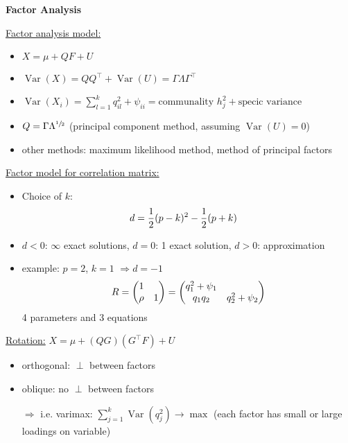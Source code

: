 \documentclass[10pt,landscape,a4paper]{article}
\DeclareMathOperator{\Var}{Var}
\begin{document}
\begin{multicols*}{4}
\begin{center}
	\normalsize{\textbf{Factor Analysis}} \\
\end{center}
\underline{Factor analysis model:}
\begin{itemize}
	\item $X = \mu + QF + U$
	\item $\Var(X) = QQ^\top + \Var(U) = \Gamma\Lambda\Gamma^\top$
	\item $\Var(X_i) = \sum_{l=1}^{k} q_{il}^2 + \psi_{ii} = \text{communality } h_j^2 + \text{specic variance}$
	\item $Q = \Gamma\Lambda^{\sfrac{1}{2}}$ (principal component method, assuming $\Var(U) = 0$)
	\item other methods: maximum likelihood method, method of principal factors
\end{itemize}
\underline{Factor model for correlation matrix:}
\begin{itemize}
	\item Choice of $k$:
	\begin{align}
		d &= \frac{1}{2}(p-k)^2 - \frac{1}{2}(p+k) \notag
	\end{align}
	\item $d<0$: $\infty$ exact solutions, $d=0$: 1 exact solution, $d>0$: approximation
	\item example: $p=2$, $k=1$ $\Rightarrow d=-1$
	\begin{align}
		R = \begin{pmatrix}
			1 & \\ \rho & 1
		\end{pmatrix} = \begin{pmatrix}
			q_1^2 + \psi_1 & \\ q_1q_2 & q_2^2 + \psi_2
		\end{pmatrix} \notag
	\end{align}
	4 parameters and 3 equations
\end{itemize}
\underline{Rotation:} $X = \mu + (QG)(G^\top F) + U$
\begin{itemize}
	\item orthogonal: $\perp$ between factors
	\item oblique: no $\perp$ between factors
	\item[$\Rightarrow$] i.e. varimax: $\sum_{j=1}^k \Var(q_j^2)\to\max$ (each factor has small or large loadings on variable)
\end{itemize}


\end{multicols*}
\end{document}
